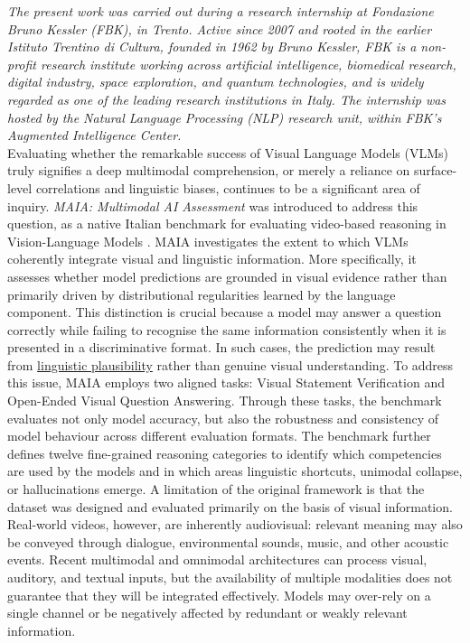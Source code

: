 

\textit{The present work was carried out during a research internship at Fondazione Bruno Kessler (FBK)\cite{fbk_website}, in Trento. Active since 2007 and rooted in the earlier Istituto Trentino di Cultura, founded in 1962 by Bruno Kessler, FBK is a non-profit research institute working across artificial intelligence, biomedical research, digital industry, space exploration, and quantum technologies, and is widely regarded as one of the leading research institutions in Italy.
The internship was hosted by the Natural Language Processing (NLP) research unit, within FBK's Augmented Intelligence Center.\\}
Evaluating whether the remarkable success of Visual Language Models (VLMs) truly signifies a deep multimodal comprehension, or merely a reliance on surface-level correlations and linguistic biases, continues to be a significant area of inquiry. \textit{MAIA: Multimodal AI Assessment} was introduced to address this question, as a native Italian benchmark for evaluating video-based reasoning in Vision-Language Models \cite{testa2025maia,testa2025allinone}.
MAIA investigates the extent to which VLMs coherently integrate visual and linguistic information. More specifically, it assesses whether model predictions are grounded in visual evidence rather than primarily driven by distributional regularities learned by the language component. This distinction is crucial because a model may answer a question correctly while failing to recognise the same information consistently when it is presented in a discriminative format. In such cases, the prediction may result from \underline{linguistic plausibility} rather than genuine visual understanding.
To address this issue, MAIA employs two aligned tasks: Visual Statement Verification and Open-Ended Visual Question Answering. Through these tasks, the benchmark evaluates not only model accuracy, but also the robustness and consistency of model behaviour across different evaluation formats. The benchmark further defines twelve fine-grained reasoning categories to identify which competencies are used by the models and in which areas linguistic shortcuts, unimodal collapse, or hallucinations emerge.
A limitation of the original framework is that the dataset was designed and evaluated primarily on the basis of visual information. Real-world videos, however, are inherently audiovisual: relevant meaning may also be conveyed through dialogue, environmental sounds, music, and other acoustic events. Recent multimodal and omnimodal architectures can process visual, auditory, and textual inputs, but the availability of multiple modalities does not guarantee that they will be integrated effectively. Models may over-rely on a single channel or be negatively affected by redundant or weakly relevant information.
